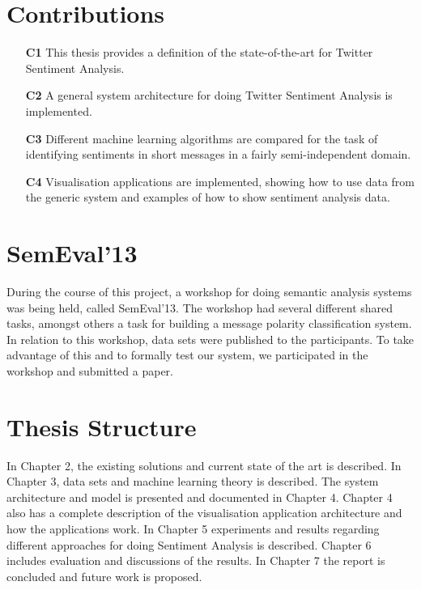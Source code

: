 \section{Contributions}
\label{sec:contribution}

\begin{itemize}
\item[\textbf{C1}] This thesis provides a definition of the state-of-the-art for Twitter Sentiment Analysis.

\item[\textbf{C2}] A general system architecture for doing Twitter Sentiment Analysis is implemented. 

\item[\textbf{C3}] Different machine learning algorithms are compared for the task of identifying sentiments in short messages in a fairly semi-independent domain.

\item[\textbf{C4}] Visualisation applications are implemented, showing how to use data from the generic system and examples of how to show sentiment analysis data.
 
\end{itemize}

\section{SemEval'13}

During the course of this project, a workshop for doing semantic analysis systems was being held, called SemEval'13. The workshop had several different shared tasks, amongst others a task for building a message polarity classification system. In relation to this workshop, data sets were published to the participants. To take advantage of this and to formally test our system, we participated in the workshop and submitted a paper. 

\section{Thesis Structure}
\label{sec:structure}

In Chapter 2, the existing solutions and current state of the art is described. In Chapter 3, data sets and machine learning theory is described. The system architecture and model is presented and documented in Chapter 4. Chapter 4 also has a complete description of the visualisation application architecture and how the applications work. In Chapter 5 experiments and results regarding different approaches for doing Sentiment Analysis is described. Chapter 6 includes evaluation and discussions of the results. In Chapter 7 the report is concluded and future work is proposed. 

